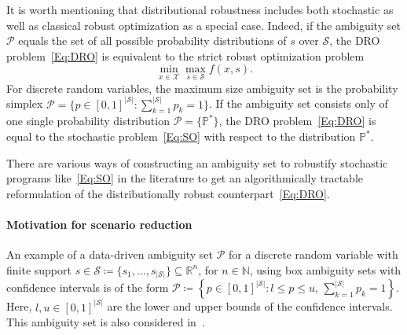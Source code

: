 \documentclass{article}
\newcommand{\mX}{\mathcal{X}}
\newcommand{\mP}{\mathcal{P}}
\newcommand{\mS}{\mathcal{S}}
\newcommand{\R}{\mathbb{R}}
\newcommand{\N}{\mathbb{N}}
\newcommand{\scen}[1]{s_{#1}}%
\newcommand{\prob}{\mathbb{P}}
\begin{document}
It is worth mentioning that distributional robustness includes both
stochastic as well as classical robust optimization as a special case.
Indeed, if the ambiguity set \(\mP\) equals the set of all possible probability distributions of \(s\) over \(\mS\), the DRO problem~\eqref{Eq:DRO} is equivalent to the strict robust optimization problem
\begin{equation}
	\min_{x\in\mX} \max_{s\in\mS} f(x,s).
\end{equation}
For discrete random variables, the maximum size ambiguity set is the probability simplex $\mP=\{ p \in [0,1]^{|\mS|}: \sum_{k=1}^{|\mS|} p_k = 1\}$.
If the ambiguity set consists only of one single probability distribution \(\mP=\{\prob^*\}\), the DRO problem~\eqref{Eq:DRO} is equal to the stochastic problem~\eqref{Eq:SO} with respect to the distribution \(\prob^*\).


There are various ways of constructing an ambiguity set to robustify
stochastic programs like~\eqref{Eq:SO} in the literature to get an
algorithmically tractable reformulation of the distributionally robust
counterpart~\eqref{Eq:DRO}. %

\paragraph*{Motivation for scenario reduction}


An example of a data-driven ambiguity set \(\mP\) for a discrete random variable with finite support \(s\in \mS\coloneqq \{\scen{1},\ldots,\scen{|\mS|}\}\subseteq \R^{n}\), for \(n\in\N\), using box ambiguity sets with confidence intervals is of the form
	$\mP \coloneqq \left\{ p\in \left[ 0,1\right]^{|\mS|} : l\leq p \leq u \text{, } \sum_{k=1}^{|\mS|} p_k=1 \right\}$.
Here, \(l, u \in [0,1]^{|\mS|}\) are the lower and upper bounds of the confidence intervals.
This ambiguity set is also considered in~\cite{DRO_over_time}.%
\end{document}
